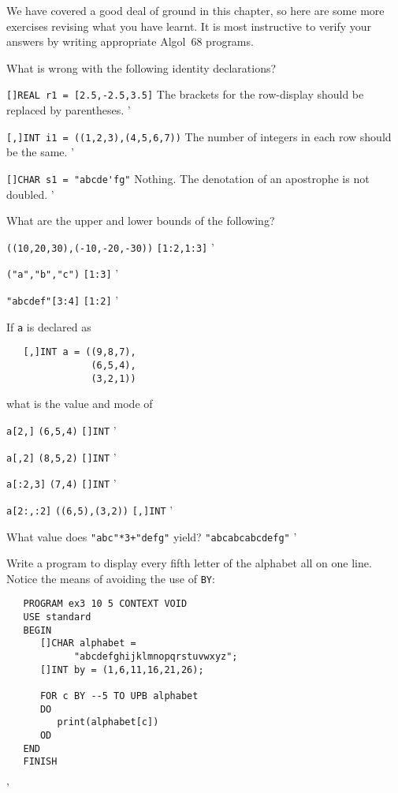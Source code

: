 We have covered a good deal of ground in this chapter, so here are
some more exercises revising what you have learnt.  It is most
instructive to verify your answers by writing appropriate Algol~68
programs.
\newpage
\begin{exercise}
\item What is wrong with the following identity declarations?
\begin{subex}
\item \verb|[]REAL r1 = [2.5,-2.5,3.5]| \subans The brackets for the
row-display should be replaced by parentheses.
'
\item \verb|[,]INT i1 = ((1,2,3),(4,5,6,7))| \subans The number of
integers in each row should be the same.
'
\item \verb|[]CHAR s1 = "abcde'fg"| \subans Nothing. The denotation
of an apostrophe is not doubled.
'
\end{subex}
\item What are the upper and lower bounds of the following?
\begin{subex}
\item \verb|((10,20,30),(-10,-20,-30))| \subans \verb|[1:2,1:3]|
'
\item \verb|("a","b","c")| \subans \verb|[1:3]|
'
\item \verb|"abcdef"[3:4]| \subans \verb|[1:2]|
'
\end{subex}
\item If \verb|a| is declared as
\begin{verbatim}
   [,]INT a = ((9,8,7),
               (6,5,4),
               (3,2,1))
\end{verbatim}
\noindent
what is the value and mode of
\begin{subex}
\item \verb|a[2,]| \subans \verb|(6,5,4)| \verb|[]INT|
'
\item \verb|a[,2]| \subans \verb|(8,5,2)| \verb|[]INT|
'
\item \verb|a[:2,3]| \subans \verb|(7,4)| \verb|[]INT|
'
\item \verb|a[2:,:2]| \subans \verb|((6,5),(3,2))| \verb|[,]INT|
'
\end{subex}
\item What value does \verb|"abc"*3+"defg"| yield?
\ans \verb|"abcabcabcdefg"|
'
\item Write a program to display every fifth letter of the alphabet
all on one line. \ans Notice the means of avoiding the use of
\verb|BY|:
\begin{verbatim}
   PROGRAM ex3 10 5 CONTEXT VOID
   USE standard
   BEGIN
      []CHAR alphabet =
            "abcdefghijklmnopqrstuvwxyz";
      []INT by = (1,6,11,16,21,26);

      FOR c BY --5 TO UPB alphabet
      DO
         print(alphabet[c])
      OD
   END
   FINISH
\end{verbatim}
'
\end{exercise}
